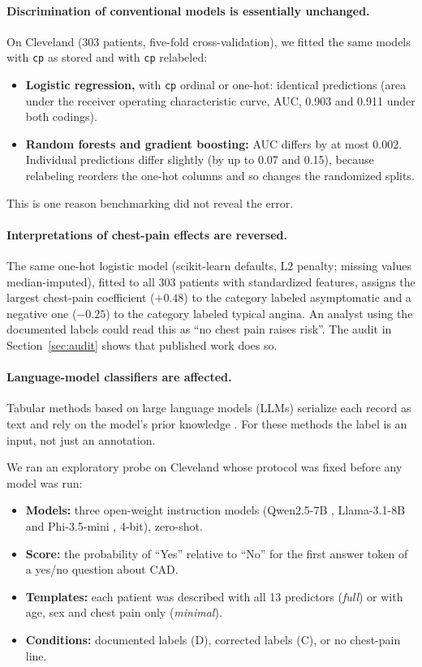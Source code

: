 \documentclass[11pt]{article}
\begin{document}
\paragraph{Discrimination of conventional models is essentially unchanged.}
On Cleveland (303 patients, five-fold cross-validation), we fitted the same models with \texttt{cp} as stored and with \texttt{cp} relabeled:
\begin{itemize}
\item \textbf{Logistic regression,} with \texttt{cp} ordinal or one-hot: identical predictions (area under the receiver operating characteristic curve, AUC, 0.903 and 0.911 under both codings).
\item \textbf{Random forests and gradient boosting:} AUC differs by at most 0.002. Individual predictions differ slightly (by up to 0.07 and 0.15), because relabeling reorders the one-hot columns and so changes the randomized splits.
\end{itemize}
This is one reason benchmarking did not reveal the error. %

\paragraph{Interpretations of chest-pain effects are reversed.}
The same one-hot logistic model (scikit-learn defaults, L2 penalty; missing values median-imputed), fitted to all 303 patients with standardized features, assigns the largest chest-pain coefficient ($+0.48$) to the category labeled asymptomatic and a negative one ($-0.25$) to the category labeled typical angina. An analyst using the documented labels could read this as ``no chest pain raises risk''. The audit in Section~\ref{sec:audit} shows that published work does so.

\paragraph{Language-model classifiers are affected.}
Tabular methods based on large language models (LLMs) serialize each record as text and rely on the model's prior knowledge \cite{hegselmann2022}. For these methods the label is an input, not just an annotation.

We ran an exploratory probe on Cleveland whose protocol was fixed before any model was run:
\begin{itemize}
\item \textbf{Models:} three open-weight instruction models (Qwen2.5-7B \cite{qwen25}, Llama-3.1-8B \cite{llama3} and Phi-3.5-mini \cite{phi3}, 4-bit), zero-shot.
\item \textbf{Score:} the probability of ``Yes'' relative to ``No'' for the first answer token of a yes/no question about CAD.
\item \textbf{Templates:} each patient was described with all 13 predictors (\emph{full}) or with age, sex and chest pain only (\emph{minimal}).
\item \textbf{Conditions:} documented labels (D), corrected labels (C), or no chest-pain line.
\end{itemize}
\end{document}
